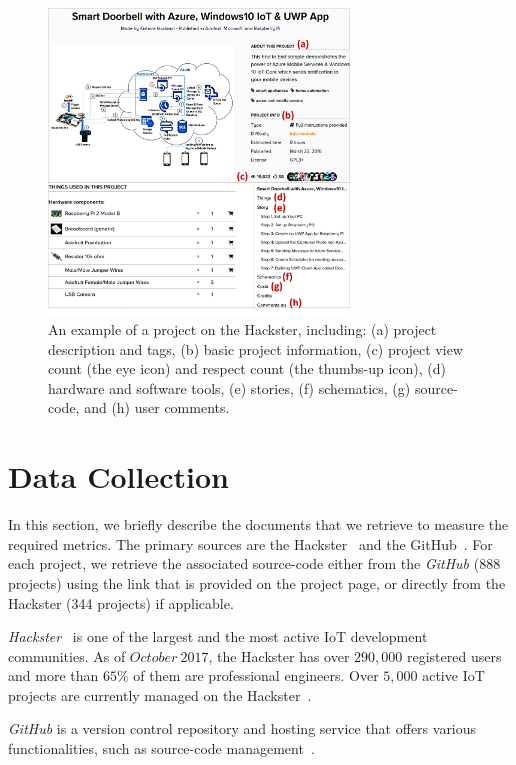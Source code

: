 


\begin{figure}[t]
	\centering
	\includegraphics[width=8cm]
	{Figures/hackster05.png}
	\caption {An example of a project on the Hackster, including: (a) project description and tags, (b) basic project information, (c) project view count (the eye icon) and respect count (the thumbs-up icon), (d) hardware and software tools, (e) stories, (f) schematics, (g) source-code, and (h) user comments.}
	\label{hacksterproject}	
	\vspace{-0.2cm}
\end{figure}


\section{Data Collection}\label{datacol}

In this section, we briefly describe the documents that we retrieve to measure the required metrics. The primary sources are the Hackster~\cite{hackster} and the GitHub~\cite{github}.
For each project, we retrieve the associated source-code either from the \textit{GitHub} (888 projects) using the link that is provided on the project page, or directly from the Hackster (344 projects) if applicable.

\textit{Hackster}~\cite{hackster} is one of the largest and the most active IoT development communities.
As of $October\ 2017$, the Hackster has over $290,000$ registered users and more than $65\%$ of them are professional engineers.
Over $5,000$ active IoT projects are currently managed on the Hackster~\cite{hackster}.

\textit{GitHub} is a version control repository and hosting service that offers various functionalities, such as source-code management~\cite{github}.

